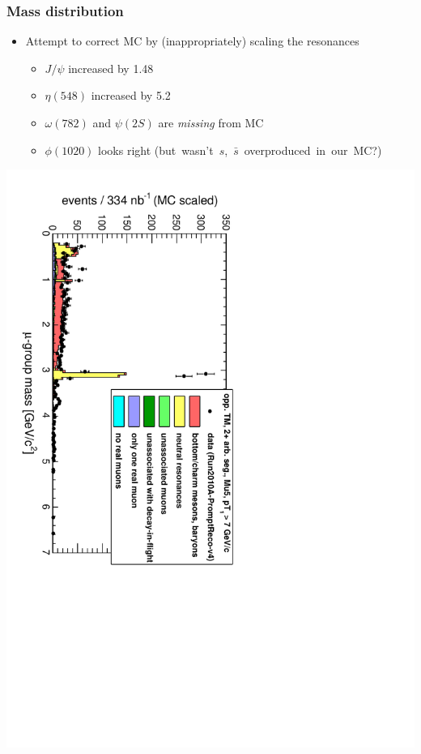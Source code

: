 \documentclass[compress]{beamer}
\begin{document}
\begin{frame}
\frametitle{Mass distribution}
\begin{itemize}
\item Attempt to correct MC by (inappropriately) scaling the resonances
\begin{itemize}
\item $J/\psi$ increased by 1.48
\item $\eta(548)$ increased by 5.2
\item $\omega(782)$ and $\psi(2S)$ are {\it missing} from MC
\item $\phi(1020)$ looks right \mbox{(but wasn't $s$, $\bar{s}$ overproduced in our MC?)\hspace{-1 cm}}
\end{itemize}
\end{itemize}

\vfill
\includegraphics[height=\linewidth, angle=90]{Mu5_mass_scaled.pdf}
\end{frame}
\end{document}
